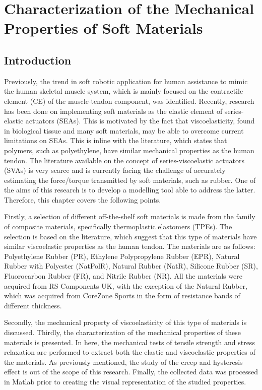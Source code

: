 \chapter{Characterization of the Mechanical Properties of Soft Materials} \label{ch:characterizationSoft}

\section{Introduction}

Previously, the trend in soft robotic application for human assistance to mimic the human skeletal muscle system, which is mainly focused on the contractile element (CE) of the muscle-tendon component, was identified. Recently, research has been done on implementing soft materials as the elastic element of series-elastic actuators (SEAs). This is motivated by the fact that viscoelasticity, found in biological tissue and many soft materials, may be able to overcome current limitations on SEAs. This is inline with the literature, which states that polymers, such as polyethylene, have similar mechanical properties as the human tendon. The literature available on the concept of series-viscoelastic actuators (SVAs) is very scarce and is currently facing the challenge of accurately estimating the force/torque transmitted by soft materials, such as rubber. One of the aims of this research is to develop a modelling tool able to address the latter. Therefore, this chapter covers the following points.

Firstly, a selection of different off-the-shelf soft materials is made from the family of composite materials, specifically thermoplastic elastomers (TPEs). The selection is based on the literature, which suggest that this type of materials have similar viscoelastic properties as the human tendon. The materials are as follows: Polyethylene Rubber (PR), Ethylene Polypropylene Rubber (EPR), Natural Rubber with Polyester (NatPolR), Natural Rubber (NatR), Silicone Rubber (SR), Fluorocarbon Rubber (FR), and Nitrile Rubber (NR). All the materials were acquired from RS Components UK\textregistered{}, with the exception of the Natural Rubber, which was acquired from CoreZone Sports\textregistered{} in the form of resistance bands of different thickness.

Secondly, the mechanical property of viscoelasticity of this type of materials is discussed. Thirdly, the characterization of the mechanical properties of these materials is presented. In here, the mechanical tests of tensile strength and stress relaxation are performed to extract both the elastic and viscoelastic properties of the materials. As previously mentioned, the study of the creep and hysteresis effect is out of the scope of this research. Finally, the collected data was processed in Matlab\textregistered{} prior to creating the visual representation of the studied properties. 

